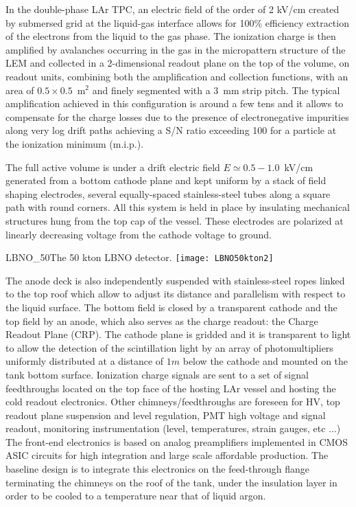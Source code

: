 In the double-phase LAr TPC, an electric field of the order of 2 kV/cm created by submersed grid at the liquid-gas interface allows for 100\% efficiency extraction of the electrons from the liquid to the gas phase. The ionization charge is then amplified by avalanches occurring in the gas in the micropattern structure of the LEM and collected in a 2-dimensional readout plane on the top of the volume, on readout units, combining both the amplification and collection functions, with an area of $0.5\times 0.5$~m$^2$ and finely segmented with a 3~mm strip pitch. The typical amplification achieved in this configuration is around a few tens and it allows to compensate for the charge losses due to the presence of electronegative impurities along very log drift paths achieving a S/N ratio exceeding 100 for a particle at the ionization minimum (m.i.p.).

The full active volume  is under a drift electric field  $E{\simeq} 0.5-1.0$~kV/cm generated from a bottom cathode plane and kept uniform by a stack of field shaping electrodes, several equally-spaced stainless-steel tubes along a square path with round corners. All this system is held in place by insulating mechanical structures hung from the top cap of the vessel. These electrodes are polarized at linearly decreasing voltage from the cathode voltage to ground. 


\begin{cdrfigure}{LBNO_50}{The 50 kton LBNO detector.}
\texttt{[image: LBNO50kton2]}
\end{cdrfigure}

The anode deck is also independently suspended with stainless-steel ropes linked to the top roof  which allow to adjust its distance and parallelism with respect to the liquid surface.  The bottom field is  closed by a transparent cathode and the top field by an anode, which also  serves as the charge readout: the Charge Readout Plane (CRP).  The cathode plane is gridded and it is transparent to light to allow the detection of the scintillation light by an array of photomultipliers uniformly distributed  at a distance of $1m$  below the cathode and mounted on the tank bottom surface. Ionization charge signals are sent to a set of signal feedthroughs located on the top face of the hosting LAr vessel and hosting the cold readout electronics. Other chimneys/feedthroughs are foreseen for HV, top readout plane suspension and level regulation, PMT high voltage and signal readout, monitoring instrumentation (level, temperatures, strain gauges, etc ...) The front-end electronics is based on analog preamplifiers implemented in CMOS ASIC circuits for high integration and large scale affordable production. The baseline design is to integrate this electronics on the feed-through flange terminating the chimneys on the roof of the tank, under the insulation layer in order to be cooled to a temperature near that of liquid argon.

